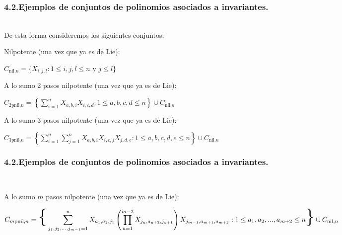 \documentclass[10pt]{beamer}
\begin{document}
\begin{frame}
\frametitle{4.2.Ejemplos de conjuntos de polinomios asociados a invariantes.}\\
De esta forma consideremos los siguientes conjuntos:\\
\begin{block}{Nilpotente (una vez que ya es de Lie):}\\
\begin{center}
$C_{\text{nil,}n}= \displaystyle \{ X _{i,j,l}:1 \leq i, j , l \leq n \text{ y } j \leq l\}$\\
\end{center}
\end{block}

\begin{block}{A lo sumo 2 pasos nilpotente (una vez que ya es de Lie):}\\
\begin{center}
$C_{\text{2pnil,}n}= \displaystyle \left \{ \sum_{i=1}^{n} X_{a,b,i} X_{i,c,d}:1\leq a,b,c,d \leq n \right \} \cup C_{\text{nil,}n}$\\
\end{center}
\end{block}

\begin{block}{A lo sumo 3 pasos nilpotente (una vez que ya es de Lie):}\\
\begin{center}
$C_{\text{3pnil,}n}= \displaystyle \left \{\sum_{i=1}^{n}\sum_{j=1}^{n} X_{a,b,i} X_{i,c,j} X_{j,d,e}:1\leq a,b,c,d,e \leq n \right \}\cup C_{\text{nil,}n}$\\
\end{center}
\end{block}
\vspace{4cm}
\end{frame}


\begin{frame}
\frametitle{4.2.Ejemplos de conjuntos de polinomios asociados a invariantes.}\\
\begin{block}{A lo sumo $m$ pasos nilpotente (una vez que ya es de Lie):}\\
\begin{center}
$C_{m\text{pnil,}n}= \displaystyle \text{\Huge{\{}}\sum_{j_1,j_2,...,j_{m-1}=1}^n X_{a_1,a_2,j_1}\left ( \prod_{u=1}^{m-2}{X_{j_{u},a_{u+2},j_{u+1}}} \right )X_{j_{m-1},a_{m+1},a_{m+2}}:

1 \leq a_1,a_2,...,a_{m+2} \leq n \text{\Huge{\}}} \cup C_{\text{nil,}n}$\\
\end{center}
\end{block}
\vspace{7cm}
\end{frame}
\end{document}
